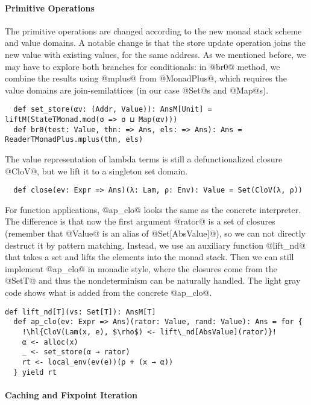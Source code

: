 \paragraph{Primitive Operations} The primitive operations are changed according to
the new monad stack scheme and value domains. A notable change is that the store
update operation joins the new value with existing values, for the same address.
As we mentioned before, we may have to explore both branches for conditionals:
in @br0@ method, we combine the results using @mplus@ from @MonadPlus@, which
requires the value domains are join-semilattices (in our case @Set@s and
@Map@s).
\begin{lstlisting}
  def set_store(αv: (Addr, Value)): AnsM[Unit] = liftM(StateTMonad.mod(σ => σ ⊔ Map(αv)))
  def br0(test: Value, thn: => Ans, els: => Ans): Ans = ReaderTMonadPlus.mplus(thn, els)
\end{lstlisting}

The value representation of lambda terms is still a defunctionalized closure
@CloV@, but we lift it to a singleton set domain.
\begin{lstlisting}
  def close(ev: Expr => Ans)(λ: Lam, ρ: Env): Value = Set(CloV(λ, ρ))
\end{lstlisting}

For function applications, @ap_clo@ looks the same as the concrete interpreter.
The difference is that now the first argument @rator@ is a set of closures (remember
that @Value@ is an alias of @Set[AbsValue]@), so we can not directly
destruct it by pattern matching. Instead, we use an auxiliary function @lift_nd@
that takes a set and lifts the elements into the monad stack. Then we can still
implement @ap_clo@ in monadic style, where the closures come from the @SetT@ and
thus the nondeterminism can be naturally handled. The light gray code shows what
is added from the concrete @ap_clo@.
\begin{lstlisting}[escapechar=!]
  def lift_nd[T](vs: Set[T]): AnsM[T]
  def ap_clo(ev: Expr => Ans)(rator: Value, rand: Value): Ans = for {
    !\hl{CloV(Lam(x, e), $\rho$) <- lift\_nd[AbsValue](rator)}!
    α <- alloc(x)
    _ <- set_store(α → rator)
    rt <- local_env(ev(e))(ρ + (x → α))
  } yield rt
\end{lstlisting}


\paragraph{Caching and Fixpoint Iteration}

